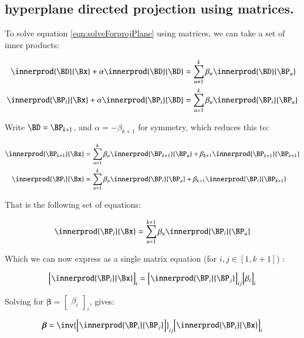 \documentclass{article}      %
\newcommand{\Bbeta}[0]{\boldsymbol{\beta}}
\begin{document}
\subsection{ hyperplane directed projection using matrices. }

To solve equation \ref{eqn:solveForprojPlane} using matrices, we can take a set of inner products:

\begin{align*}
\innerprod{\BD}{\Bx} + \alpha \innerprod{\BD}{\BD} &= \sum_{u=1}^k \beta_u \innerprod{\BD}{\BP_u} \\
\innerprod{\BP_i}{\Bx} + \alpha \innerprod{\BP_i}{\BD} &= \sum_{u=1}^k \beta_u \innerprod{\BP_i}{\BP_u}
\end{align*}

Write $\BD = \BP_{k+1}$, and $\alpha = -\beta_{k+1}$ for symmetry, which reduces this to:

\begin{align*}
\innerprod{\BP_{k+1}}{\Bx} &= \sum_{u=1}^k \beta_u \innerprod{\BP_{k+1}}{\BP_u} + \beta_{k+1} \innerprod{\BP_{k+1}}{\BP_{k+1}}  \\
\innerprod{\BP_i}{\Bx} &= \sum_{u=1}^k \beta_u \innerprod{\BP_i}{\BP_u} + \beta_{k+1} \innerprod{\BP_i}{\BP_{k+1}}
\end{align*}

That is the following set of equations:

\[
\innerprod{\BP_i}{\Bx} = \sum_{u=1}^{k+1} \beta_u \innerprod{\BP_i}{\BP_u}
\]

Which we can now express as a single matrix equation (for $i,j \in [1,k+1]$) :

\begin{equation}
{
\begin{bmatrix}
\innerprod{\BP_i}{\Bx}
\end{bmatrix}
}_i
=
{
\begin{bmatrix}
\innerprod{\BP_i}{\BP_j}
\end{bmatrix}
}_{ij}
{
\begin{bmatrix}
\beta_i
\end{bmatrix}
}_i
\end{equation}

Solving for $\Bbeta = 
{
\begin{bmatrix}
\beta_i
\end{bmatrix}
}_i
$, gives:

\[
\Bbeta = 
\inv{
\begin{bmatrix}
\innerprod{\BP_i}{\BP_j}
\end{bmatrix}
}_{ij}
{
\begin{bmatrix}
\innerprod{\BP_i}{\Bx}
\end{bmatrix}
}_i
\]
\end{document}
